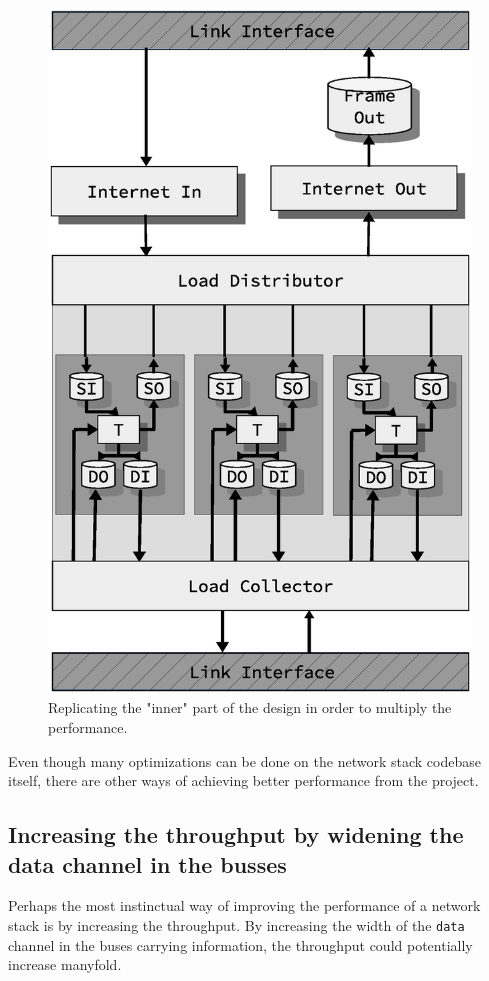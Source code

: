 \begin{figure}
\centering
\includegraphics[scale=0.45]{discussion/design_stacked.eps}
\caption{Replicating the "inner" part of the design in order to multiply the
performance. }
\label{fig:design_stacked}
\end{figure}


Even though many optimizations can be done on the network stack codebase
itself, there are other ways of achieving better performance from the project.

\subsection{Increasing the throughput by widening the data channel in the
busses}
Perhaps the most instinctual way of improving the performance of a network
stack is by increasing the throughput. By increasing the width of the
\texttt{data} channel in the buses carrying information, the throughput could
potentially increase manyfold.


